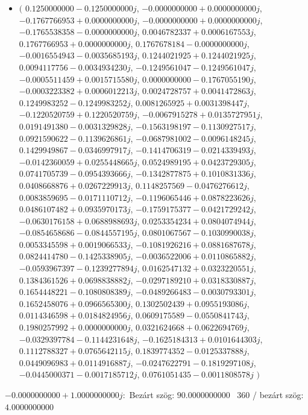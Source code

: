\documentclass[14pt,a4paper]{article}
\begin{document}
\begin{itemize}
\item
$\big($
$0.1250000000-0.1250000000j$, $-0.0000000000+0.0000000000j$, $-0.1767766953+0.0000000000j$, $-0.0000000000+0.0000000000j$, $-0.1765538358-0.0000000000j$, $0.0046782337+0.0006167553j$, $0.1767766953+0.0000000000j$, $0.1767678184-0.0000000000j$, $-0.0016554943-0.0035685193j$, $0.1244021925+0.1244021925j$, $0.0094117756-0.0034934230j$, $-0.1249561047-0.1249561047j$, $-0.0005511459+0.0015715580j$, $0.0000000000-0.1767055190j$, $-0.0003223382+0.0006012213j$, $0.0024728757+0.0041472863j$, $0.1249983252-0.1249983252j$, $0.0081265925+0.0031398447j$, $-0.1220520759+0.1220520759j$, $-0.0067915278+0.0135727951j$, $0.0191491380-0.0031329828j$, $-0.1563198197-0.1130927517j$, $0.0921590622-0.1139626861j$, $-0.0687981002-0.0096148245j$, $0.1429949867-0.0346997917j$, $-0.1414706319-0.0214339493j$, $-0.0142360059+0.0255448665j$, $0.0524989195+0.0423729305j$, $0.0741705739-0.0954393666j$, $-0.1342877875+0.1010831336j$, $0.0408668876+0.0267229913j$, $0.1148257569-0.0476276612j$, $0.0083859695-0.0171110712j$, $-0.1196065446+0.0878223626j$, $0.0486107482+0.0935970173j$, $-0.1759175377-0.0421729242j$, $-0.0630176158+0.0688988693j$, $0.0253354234+0.0804074944j$, $-0.0854658686-0.0844557195j$, $0.0801067567-0.1030990038j$, $0.0053345598+0.0019066533j$, $-0.1081926216+0.0881687678j$, $0.0824414780-0.1425338905j$, $-0.0036522006+0.0110865882j$, $-0.0593967397-0.1239277894j$, $0.0162547132+0.0323220551j$, $0.1384361526+0.0698838882j$, $-0.0297189210+0.0318330887j$, $0.1654448221-0.1080808389j$, $-0.0489266483-0.0030793301j$, $0.1652458076+0.0966565300j$, $0.1302502439+0.0955193086j$, $0.0114346598+0.0184824956j$, $0.0609175589-0.0550841743j$, $0.1980257992+0.0000000000j$, $0.0321624668+0.0622694769j$, $-0.0329397784-0.1144231648j$, $-0.1625184313+0.0101644303j$, $0.1112788327+0.0765642115j$, $0.1839774352-0.0125337888j$, $0.0449096983+0.0114916887j$, $-0.0247622791-0.1819297108j$, $-0.0445000371-0.0017185712j$, $0.0761051435-0.0011808578j$
$\big)$
\end{itemize}
$-0.0000000000+1.0000000000j$:\
Bezárt szög: $90.0000000000$ \
360 / bezárt szög: $4.0000000000$\
\end{document}
